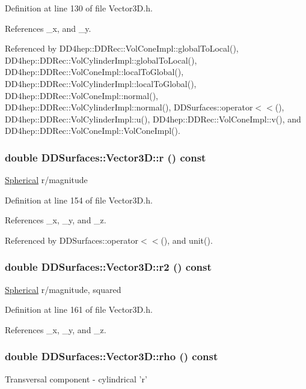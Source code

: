 Definition at line 130 of file Vector3D.h.

References \_\-x, and \_\-y.

Referenced by DD4hep::DDRec::VolConeImpl::globalToLocal(), DD4hep::DDRec::VolCylinderImpl::globalToLocal(), DD4hep::DDRec::VolConeImpl::localToGlobal(), DD4hep::DDRec::VolCylinderImpl::localToGlobal(), DD4hep::DDRec::VolConeImpl::normal(), DD4hep::DDRec::VolCylinderImpl::normal(), DDSurfaces::operator$<$$<$(), DD4hep::DDRec::VolCylinderImpl::u(), DD4hep::DDRec::VolConeImpl::v(), and DD4hep::DDRec::VolConeImpl::VolConeImpl().\hypertarget{class_d_d_surfaces_1_1_vector3_d_a9167cd0ad13311186a093e572d9e5a74}{
\subsubsection[{r}]{\setlength{\rightskip}{0pt plus 5cm}double DDSurfaces::Vector3D::r () const}}
\label{class_d_d_surfaces_1_1_vector3_d_a9167cd0ad13311186a093e572d9e5a74}
\hyperlink{struct_d_d_surfaces_1_1_vector3_d_1_1_spherical}{Spherical} r/magnitude 

Definition at line 154 of file Vector3D.h.

References \_\-x, \_\-y, and \_\-z.

Referenced by DDSurfaces::operator$<$$<$(), and unit().\hypertarget{class_d_d_surfaces_1_1_vector3_d_a56922c6c4226eee3c30e1f02de529294}{
\subsubsection[{r2}]{\setlength{\rightskip}{0pt plus 5cm}double DDSurfaces::Vector3D::r2 () const}}
\label{class_d_d_surfaces_1_1_vector3_d_a56922c6c4226eee3c30e1f02de529294}
\hyperlink{struct_d_d_surfaces_1_1_vector3_d_1_1_spherical}{Spherical} r/magnitude, squared 

Definition at line 161 of file Vector3D.h.

References \_\-x, \_\-y, and \_\-z.\hypertarget{class_d_d_surfaces_1_1_vector3_d_a85a0cae7559e019ae6e9b905b2b190bb}{
\subsubsection[{rho}]{\setlength{\rightskip}{0pt plus 5cm}double DDSurfaces::Vector3D::rho () const}}
\label{class_d_d_surfaces_1_1_vector3_d_a85a0cae7559e019ae6e9b905b2b190bb}
Transversal component -\/ cylindrical 'r' 

